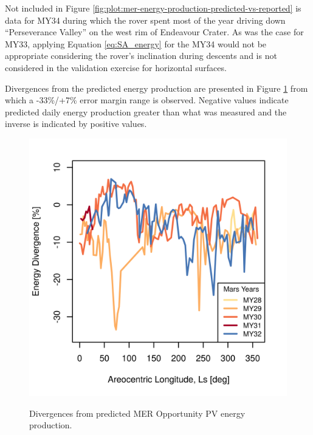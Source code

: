 
Not included in Figure \ref{fig:plot:mer-energy-production-predicted-vs-reported} is data for MY34 during which the rover spent most of the year driving down ``Perseverance Valley'' on the west rim of Endeavour Crater. As was the case for MY33, applying Equation \ref{eq:SA_energy} for the MY34 would not be appropriate considering the rover's inclination during descents and is not considered in the validation exercise for horizontal surfaces.


Divergences from the predicted energy production are presented in Figure \ref{fig:plot:mer-energy-prediction-divergences} from which a -33\%/+7\% error margin range is observed. Negative values indicate predicted daily energy production greater than what was measured and the inverse is indicated by positive values.

\begin{figure}[h]
  \centering
  \hypersetup{linkcolor=captionTextColor}
  \includegraphics[width=0.8\linewidth]{sections/power-and-energy-predictions/plots/energy-prediction-divergences-from-my28-to-my32.png}\\
  \caption[Divergences from predicted \ac{MER} Opportunity \ac{PV} energy production]
          {Divergences from predicted \ac{MER} Opportunity \ac{PV} energy production.}
  \label{fig:plot:mer-energy-prediction-divergences}
\end{figure}

